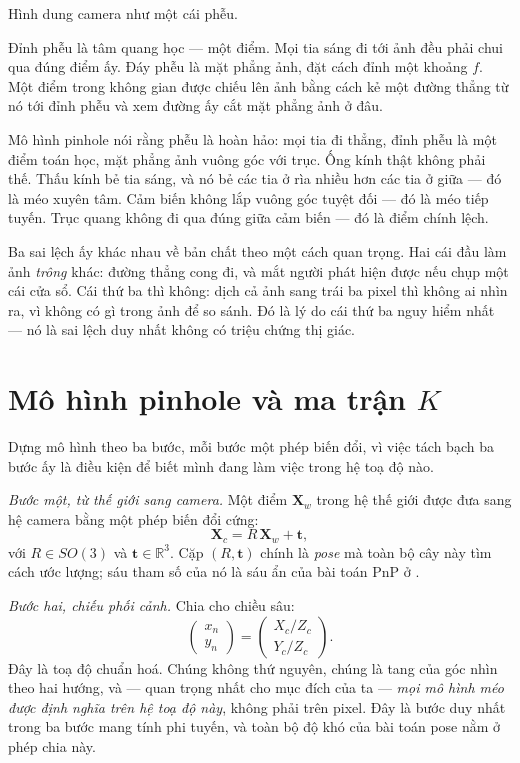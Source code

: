 \documentclass[../../marker.tex]{subfiles}
\begin{document}
\begin{trucgiac}
Hình dung camera như một cái phễu.

Đỉnh phễu là tâm quang học --- một điểm. Mọi tia sáng đi tới ảnh đều phải chui qua đúng điểm ấy. Đáy phễu là mặt phẳng ảnh, đặt cách đỉnh một khoảng \(f\). Một điểm trong không gian được chiếu lên ảnh bằng cách kẻ một đường thẳng từ nó tới đỉnh phễu và xem đường ấy cắt mặt phẳng ảnh ở đâu.

Mô hình pinhole nói rằng phễu là hoàn hảo: mọi tia đi thẳng, đỉnh phễu là một điểm toán học, mặt phẳng ảnh vuông góc với trục. Ống kính thật không phải thế. Thấu kính bẻ tia sáng, và nó bẻ các tia ở rìa nhiều hơn các tia ở giữa --- đó là méo xuyên tâm. Cảm biến không lắp vuông góc tuyệt đối --- đó là méo tiếp tuyến. Trục quang không đi qua đúng giữa cảm biến --- đó là điểm chính lệch.

Ba sai lệch ấy khác nhau về bản chất theo một cách quan trọng. Hai cái đầu làm ảnh \emph{trông} khác: đường thẳng cong đi, và mắt người phát hiện được nếu chụp một cái cửa sổ. Cái thứ ba thì không: dịch cả ảnh sang trái ba pixel thì không ai nhìn ra, vì không có gì trong ảnh để so sánh. Đó là lý do cái thứ ba nguy hiểm nhất --- nó là sai lệch duy nhất không có triệu chứng thị giác.
\end{trucgiac}

\section{Mô hình pinhole và ma trận \texorpdfstring{\(K\)}{K}}

Dựng mô hình theo ba bước, mỗi bước một phép biến đổi, vì việc tách bạch ba bước ấy là điều kiện để biết mình đang làm việc trong hệ toạ độ nào.

\emph{Bước một, từ thế giới sang camera.} Một điểm \(\mathbf{X}_w\) trong hệ thế giới được đưa sang hệ camera bằng một phép biến đổi cứng:
\[
\mathbf{X}_c = R\,\mathbf{X}_w + \mathbf{t},
\]
với \(R \in SO(3)\) và \(\mathbf{t} \in \mathbb{R}^3\). Cặp \((R, \mathbf{t})\) chính là \emph{pose} mà toàn bộ cây này tìm cách ước lượng; sáu tham số của nó là sáu ẩn của bài toán PnP ở .

\emph{Bước hai, chiếu phối cảnh.} Chia cho chiều sâu:
\[
\begin{pmatrix} x_n \\ y_n \end{pmatrix}
= \begin{pmatrix} X_c/Z_c \\ Y_c/Z_c \end{pmatrix}.
\]
Đây là toạ độ chuẩn hoá. Chúng không thứ nguyên, chúng là tang của góc nhìn theo hai hướng, và --- quan trọng nhất cho mục đích của ta --- \emph{mọi mô hình méo được định nghĩa trên hệ toạ độ này}, không phải trên pixel. Đây là bước duy nhất trong ba bước mang tính phi tuyến, và toàn bộ độ khó của bài toán pose nằm ở phép chia này.
\end{document}
